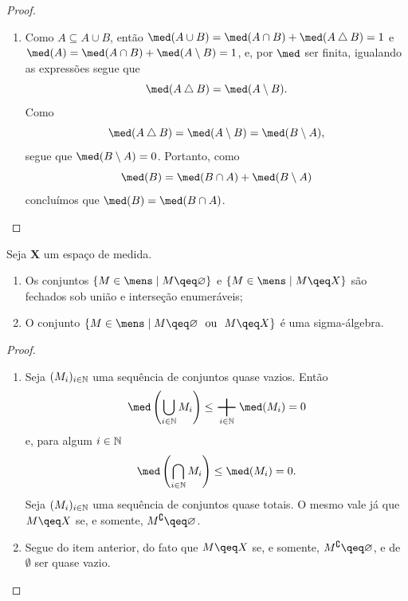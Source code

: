 \begin{proof}
\begin{enumerate}
\item Como $A \subseteq A \cup B$, então $\med(A \cup B) = \med(A \cap B) + \med(A \difsim B) = 1$ e $\med(A) = \med(A \cap B) + \med(A \setminus B) = 1$, e, por $\med$ ser finita, igualando as expressões segue que
	\begin{equation*}
	\med(A \difsim B) = \med(A \setminus B).
	\end{equation*}
Como 
	\begin{equation*}
	\med(A \difsim B) = \med(A \setminus B) = \med(B \setminus A),
	\end{equation*}
segue que $\med(B \setminus A)=0$. Portanto, como
	\begin{equation*}
	\med(B) = \med(B \cap A) + \med(B \setminus A)
	\end{equation*}
concluímos que $\med(B) = \med(B \cap A)$.
	\end{enumerate}
\end{proof}

\begin{prop}
Seja $\bm X$ um espaço de medida.
	\begin{enumerate}
	\item Os conjuntos $\set{M \in \mens}{M \qeq \emptyset}$ e $\set{M \in \mens}{M \qeq X}$ são fechados sob união e interseção enumeráveis;
	\item O conjunto $\set{M \in \mens}{M \qeq \emptyset \ou M \qeq X}$ é uma sigma-álgebra.
	\end{enumerate}
\end{prop}
\begin{proof}
	\begin{enumerate}
	\item Seja $(M_i)_{i \in \mathbb{N}}$ uma sequência de conjuntos quase vazios. Então
		\begin{equation*}
		\med\left( \bigcup_{i \in \N} M_i \right) \leq \sum_{i \in \N} \med(M_i) = 0
		\end{equation*}
e, para algum $i \in \mathbb{N}$
		\begin{equation*}
		\med\left( \bigcap_{i \in \N} M_i \right) \leq \med(M_i) = 0.
		\end{equation*}
Seja $(M_i)_{i \in \mathbb{N}}$ uma sequência de conjuntos quase totais. O mesmo vale já que $M \qeq X$ se, e somente, $M^\complement \qeq \emptyset$.
	\item Segue do item anterior, do fato que $M \qeq X$ se, e somente, $M^\complement \qeq \emptyset$, e de $\emptyset$ ser quase vazio.
	\end{enumerate}
\end{proof}

